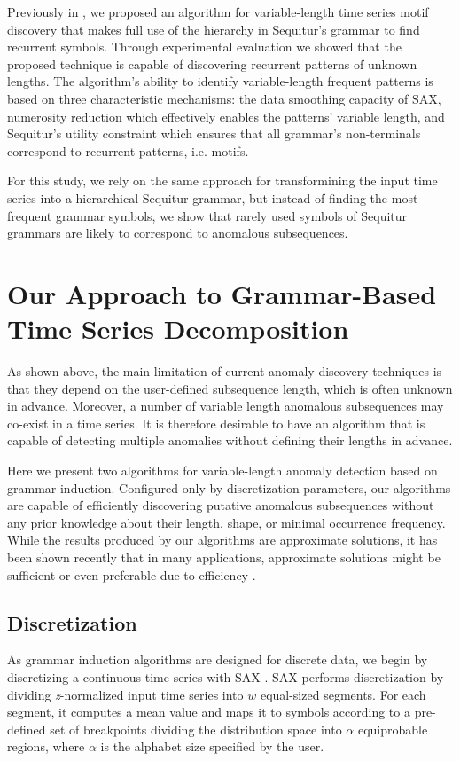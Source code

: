 \documentclass{llncs}
\begin{document}
Previously in \cite{grammarviz}, we proposed an algorithm for variable-length time series motif discovery that makes full use of the hierarchy in Sequitur's grammar to find recurrent symbols. Through experimental evaluation we showed that the proposed technique is capable of discovering recurrent patterns of unknown lengths. The algorithm's ability to identify variable-length frequent patterns is based on three characteristic mechanisms: the data smoothing capacity of SAX,  numerosity reduction which effectively enables the patterns' variable length, and Sequitur's utility constraint which ensures that all grammar's non-terminals correspond to recurrent patterns, i.e. motifs.

For this study, we rely on the same approach for transformining the input time series into a hierarchical Sequitur grammar, but instead of finding the most frequent grammar symbols, we show that rarely used symbols of Sequitur grammars are likely to correspond to anomalous subsequences.

\section{Our Approach to Grammar-Based Time Series Decomposition}
As shown above, the main limitation of current anomaly discovery techniques is that they depend on the user-defined subsequence length, which is often unknown in advance. Moreover, a number of variable length anomalous subsequences may co-exist in a time series. It is therefore desirable to have an algorithm that is capable of detecting multiple anomalies without defining their lengths in advance.

Here we present two algorithms for variable-length anomaly detection based on grammar induction. Configured only by discretization parameters, our algorithms are capable of efficiently discovering putative anomalous subsequences without any prior knowledge about their length, shape, or minimal occurrence frequency. While the results produced by our algorithms are approximate solutions, it has been shown recently that in many applications, approximate solutions might be sufficient or even preferable due to efficiency \cite{grammarviz}. 


\subsection{Discretization}
As grammar induction algorithms are designed for discrete data, we begin by discretizing a continuous time series with SAX \cite{sax}. SAX performs discretization by dividing \textit{z}-normalized input time series into $w$ equal-sized segments. For each segment, it computes a mean value and maps it to symbols according to a pre-defined set of breakpoints dividing the distribution space into $\alpha$ equiprobable regions, where $\alpha$ is the alphabet size specified by the user. 
\end{document}
